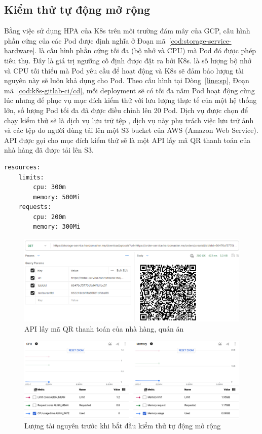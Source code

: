 \subsection{Kiểm thử tự động mở rộng}
Bằng việc sử dụng HPA của K8s trên môi trường đám mây của GCP, cấu hình phần cứng của các Pod được định nghĩa ở Đoạn mã~\ref{cod:storage-service-hardware}.
 là cấu hình phần cứng tối đa (bộ nhớ và CPU) mà Pod đó được phép tiêu thụ.
Đây là giá trị ngưỡng cố định được đặt ra bởi K8s.
 là số lượng bộ nhớ và CPU tối thiểu mà Pod yêu cầu để hoạt động và K8s sẽ đảm bảo lượng tài nguyên này sẽ luôn khả dụng cho Pod.
Theo cấu hình tại Dòng~\ref{line:sp}, Đoạn mã~\ref{cod:k8s-gitlab-ci/cd}, mỗi deployment sẽ có tối đa năm Pod hoạt động cùng lúc nhưng để phục vụ mục đích kiểm thử với lưu lượng thực tế của một hệ thống lớn, số lượng Pod tối đa đã được điều chỉnh lên 20 Pod.
Dịch vụ được chọn để chạy kiểm thử sẽ là dịch vụ lưu trữ tệp , dịch vụ này phụ trách việc lưu trữ ảnh và các tệp do người dùng tải lên một S3 bucket của AWS (Amazon Web Service).
API được gọi cho mục đích kiểm thử sẽ là một API lấy mã QR thanh toán của nhà hàng đã được tải lên S3.
\begin{lstlisting}[style=yaml, caption={Đoạn mã cấu hình phần cứng cho \tcode{storage-service} trên GKE.}, label={cod:storage-service-hardware},  captionpos=b]
resources:
    limits:
        cpu: 300m
        memory: 500Mi
    requests:
        cpu: 200m
        memory: 300Mi
\end{lstlisting}
\begin{figure}
    \centering
    \includegraphics[width=1\linewidth]{images/hChip/test/API-example.png}
    \caption{API lấy mã QR thanh toán của nhà hàng, quán ăn}
    \label{fig:API-QR-code}
\end{figure}
\begin{figure}[H]
	\centering
	\includegraphics[width=\textwidth]{images/hChip/test/resourse-before-test.png}
	\caption{Lượng tài nguyên trước khi bắt đầu kiểm thử tự động mở rộng}
	\label{fig:resource-before-test}
\end{figure}

